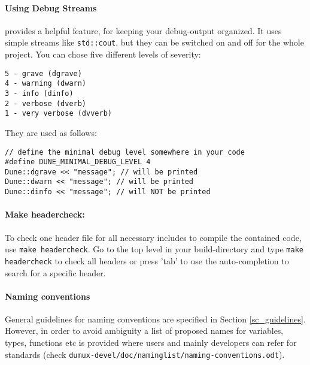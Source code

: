 \paragraph{Using \Dune Debug Streams}
\Dune provides a helpful feature, for keeping your debug-output organized.
It uses simple streams like \texttt{std::cout}, but they can be switched on and off
for the whole project. You can chose five different levels of severity:
\begin{verbatim}
5 - grave (dgrave)
4 - warning (dwarn)
3 - info (dinfo)
2 - verbose (dverb)
1 - very verbose (dvverb)
\end{verbatim}
\noindent They are used as follows:
\begin{lstlisting}[style=DumuxCode]
// define the minimal debug level somewhere in your code
#define DUNE_MINIMAL_DEBUG_LEVEL 4
Dune::dgrave << "message"; // will be printed
Dune::dwarn << "message"; // will be printed
Dune::dinfo << "message"; // will NOT be printed
\end{lstlisting}

\paragraph{Make headercheck:}
To check one header file for all necessary includes to compile the contained
code, use \texttt{make headercheck}. Go to the top level in your build-directory
and type \texttt{make headercheck} to check all headers or press 'tab' to use the
auto-completion to search for a specific header.

\paragraph{Naming conventions}
General guidelines for naming conventions are specified in Section \ref{sc_guidelines}.
However, in order to avoid ambiguity a list of proposed names for variables, types,
functions etc is provided where users and mainly \Dumux developers can refer for
standards (check \texttt{dumux-devel/\allowbreak doc/\allowbreak naminglist/\allowbreak naming-conventions.odt}).
